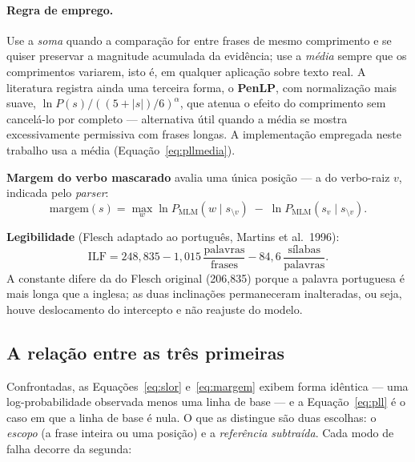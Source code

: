 \documentclass[11pt,a4paper]{article}
\begin{document}
\paragraph{Regra de emprego.} Use a \emph{soma} quando a comparação for entre frases de mesmo
comprimento e se quiser preservar a magnitude acumulada da evidência; use a \emph{média} sempre que
os comprimentos variarem, isto é, em qualquer aplicação sobre texto real. A literatura registra
ainda uma terceira forma, o \textbf{PenLP}, com normalização mais suave, $\ln P(s)/((5+|s|)/6)^{\alpha}$,
que atenua o efeito do comprimento sem cancelá-lo por completo --- alternativa útil quando a média
se mostra excessivamente permissiva com frases longas. A implementação empregada neste trabalho usa
a média (Equação~\ref{eq:pllmedia}).

\textbf{Margem do verbo mascarado} avalia uma única posição --- a do verbo-raiz $v$, indicada pelo
\textit{parser}:
\begin{equation}
\mathrm{margem}(s) = \max_{w} \ln P_{\mathrm{MLM}}(w \mid s_{\setminus v})
                     \; - \; \ln P_{\mathrm{MLM}}(s_v \mid s_{\setminus v}).
\label{eq:margem}
\end{equation}

\textbf{Legibilidade} (Flesch adaptado ao português, Martins et al.\ 1996):
\begin{equation}
\mathrm{ILF} = 248{,}835 - 1{,}015\,\frac{\text{palavras}}{\text{frases}}
                          - 84{,}6\,\frac{\text{sílabas}}{\text{palavras}}.
\label{eq:ilf}
\end{equation}
A constante difere da do Flesch original (206,835) porque a palavra portuguesa é mais longa que a
inglesa; as duas inclinações permaneceram inalteradas, ou seja, houve deslocamento do intercepto e
não reajuste do modelo.

\subsection{A relação entre as três primeiras}

Confrontadas, as Equações~\ref{eq:slor} e~\ref{eq:margem} exibem forma idêntica --- uma
log-probabilidade observada menos uma linha de base --- e a Equação~\ref{eq:pll} é o caso em que a
linha de base é nula. O que as distingue são duas escolhas: o \emph{escopo} (a frase inteira ou uma
posição) e a \emph{referência subtraída}. Cada modo de falha decorre da segunda:
\end{document}

